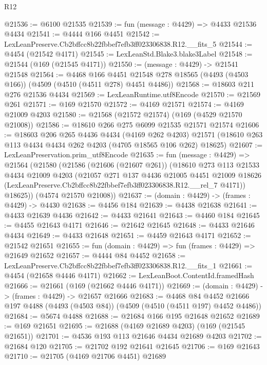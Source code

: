\begin{lexlean}{R12}
\begin{coremodule}
@21536 := @6100 @21535
@21539 := fun (message : @4429) => @4433 @21536 @4434
@21541 := @4444 @166 @4451
@21542 := LexLeanPreserve.Cb2bffcc8b22fbbef7efb3ff023306838.R12.__fits_5
@21544 := @4454 (@21542 @4171)
@21545 := LexLeanStd.Blake3.blake3Label
@21548 := @21544 (@169 (@21545 @4171))
@21550 := (message : @4429) -> @21541 @21548
@21564 := @4468
    @166
    @4451
    @21548
    @278
    @18565
    (@4493 (@4503 @166))
    (@4509 (@4510 (@4511 @278) @4451 @4486))
@21568 := @18603 @211 @276 @21536 @4434
@21569 := LexLeanRuntime.utf8Encode
@21570 := @21569 @261
@21571 := @169 @21570
@21572 := @4169 @21571
@21574 := @4169 @21009 @4203
@21580 := @21568 (@21572 @21574) (@169 (@4529 @21570 @21008))
@21586 := @18610 @266 @275 @6099 @21535 @21571 @21574
@21606 := @18603
    @206
    @265
    @4436
    @4434
    (@4169 @262 @4203)
    @21571
    (@18610 @263 @113 @4434 @4434 @262 @4203 (@4705 @18565 @106 @262) @18625)
@21607 := LexLeanPreservation.prim_utf8Encode
@21635 := fun (message : @4429) =>
  @21564
    (@21580
      (@21586
        (@21606 (@21607 @261))
        (@18610
          @273
          @113
          @21533
          @4434
          @21009
          @4203
          (@21057
            @271
            @137
            @4436
            @21005
            @4451
            @21009
            @18626
            (LexLeanPreserve.Cb2bffcc8b22fbbef7efb3ff023306838.R12.__rel_7 @4171))
          @18625))
      (@4574 @21570 @21008))
@21637 := (domain : @4429) -> (frames : @4429) -> @4430
@21638 := @4456 @184
@21639 := @4438 @21638
@21641 := @4433 @21639 @4436
@21642 := @4433 @21641
@21643 := @4460 @184
@21645 := @4455 @21643 @4171
@21646 := @21642 @21645
@21648 := @4433 @21646 @4434
@21649 := @4433 @21648
@21651 := @4459 @21643 @4171
@21652 := @21542 @21651
@21655 := fun (domain : @4429) => fun (frames : @4429) => @21649 @21652
@21657 := @4444 @84 @4452
@21658 := LexLeanPreserve.Cb2bffcc8b22fbbef7efb3ff023306838.R12.__fits_1
@21661 := @4454 (@21658 @4446 @4171)
@21662 := LexLeanBoot.ContentId.framedHash
@21666 := @21661 (@169 (@21662 @4446 @4171))
@21669 := (domain : @4429) -> (frames : @4429) -> @21657 @21666
@21683 := @4468
    @84
    @4452
    @21666
    @197
    @4488
    (@4493 (@4503 @84))
    (@4509 (@4510 (@4511 @197) @4452 @4486))
@21684 := @5674 @4488
@21688 := @21684 @166 @195 @21648 @21652
@21689 := @169 @21651
@21695 := @21688 (@4169 @21689 @4203) (@169 (@21545 @21651))
@21701 := @4536 @193 @113 @21646 @4434 @21689 @4203
@21702 := @21684 @120
@21705 := @21702 @192 @21641 @21645
@21706 := @169 @21643
@21710 := @21705 (@4169 @21706 @4451) @21689

\end{coremodule}
\end{lexlean}
